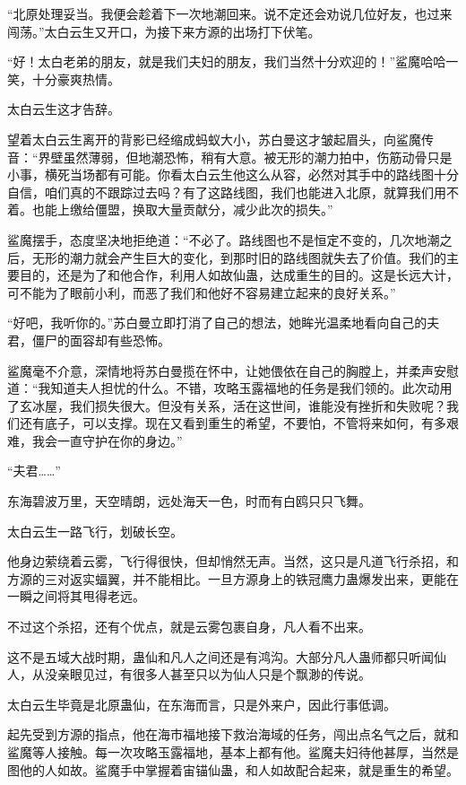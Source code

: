 \begin{this_body}
“北原处理妥当。我便会趁着下一次地潮回来。说不定还会劝说几位好友，也过来闯荡。”太白云生又开口，为接下来方源的出场打下伏笔。

“好！太白老弟的朋友，就是我们夫妇的朋友，我们当然十分欢迎的！”鲨魔哈哈一笑，十分豪爽热情。

太白云生这才告辞。

望着太白云生离开的背影已经缩成蚂蚁大小，苏白曼这才皱起眉头，向鲨魔传音：“界壁虽然薄弱，但地潮恐怖，稍有大意。被无形的潮力拍中，伤筋动骨只是小事，横死当场都有可能。你看太白云生他这么从容，必然对其手中的路线图十分自信，咱们真的不跟踪过去吗？有了这路线图，我们也能进入北原，就算我们用不着。也能上缴给僵盟，换取大量贡献分，减少此次的损失。”

鲨魔摆手，态度坚决地拒绝道：“不必了。路线图也不是恒定不变的，几次地潮之后，无形的潮力就会产生巨大的变化，到那时旧的路线图就失去了价值。我们的主要目的，还是为了和他合作，利用人如故仙蛊，达成重生的目的。这是长远大计，可不能为了眼前小利，而恶了我们和他好不容易建立起来的良好关系。”

“好吧，我听你的。”苏白曼立即打消了自己的想法，她眸光温柔地看向自己的夫君，僵尸的面容却有些恐怖。

鲨魔毫不介意，深情地将苏白曼揽在怀中，让她偎依在自己的胸膛上，并柔声安慰道：“我知道夫人担忧的什么。不错，攻略玉露福地的任务是我们领的。此次动用了玄冰屋，我们损失很大。但没有关系，活在这世间，谁能没有挫折和失败呢？我们还有底子，可以支撑。现在又看到重生的希望，不要怕，不管将来如何，有多艰难，我会一直守护在你的身边。”

“夫君……”

东海碧波万里，天空晴朗，远处海天一色，时而有白鸥只只飞舞。

太白云生一路飞行，划破长空。

他身边萦绕着云雾，飞行得很快，但却悄然无声。当然，这只是凡道飞行杀招，和方源的三对返实蝠翼，并不能相比。一旦方源身上的铁冠鹰力蛊爆发出来，更能在一瞬之间将其甩得老远。

不过这个杀招，还有个优点，就是云雾包裹自身，凡人看不出来。

这不是五域大战时期，蛊仙和凡人之间还是有鸿沟。大部分凡人蛊师都只听闻仙人，从没亲眼见过，有很多人甚至只以为仙人只是个飘渺的传说。

太白云生毕竟是北原蛊仙，在东海而言，只是外来户，因此行事低调。

起先受到方源的指点，他在海市福地接下救治海域的任务，闯出点名气之后，就和鲨魔等人接触。每一次攻略玉露福地，基本上都有他。鲨魔夫妇待他甚厚，当然是图他的人如故。鲨魔手中掌握着宙锚仙蛊，和人如故配合起来，就是重生的希望。


\end{this_body}
